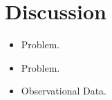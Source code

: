 %

\section{Discussion}
\label{sec:7_Discussion}

\begin{itemize}
\item Problem.
\item Problem.
\item Observational Data.
\end{itemize}
